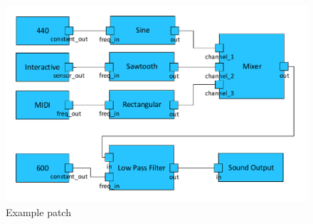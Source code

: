 	\begin{figure}[!h]
		\centering
			\includegraphics[width=\textwidth]{images/ex_patch.pdf}
		\caption{Example patch}
		\label{fig:ex_patch}
	\end{figure}

